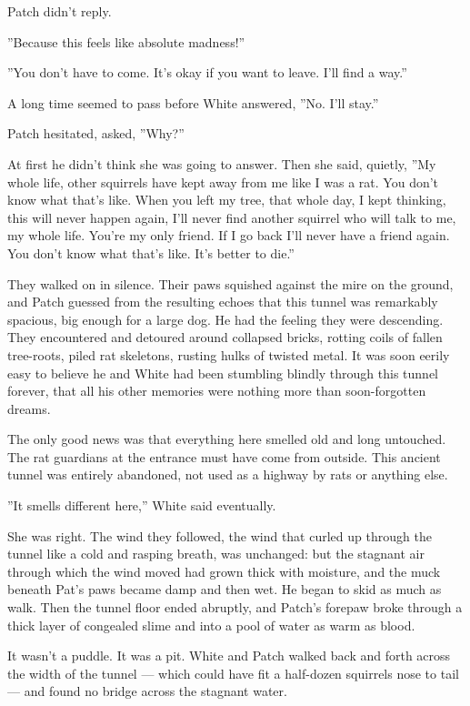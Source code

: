\documentclass[12pt]{book}
\begin{document}
Patch didn't reply.

''Because this feels like absolute madness!''

''You don't have to come. It's okay if you want to leave. I'll find a way.''

A long time seemed to pass before White answered, ''No. I'll stay.''

Patch hesitated, asked, ''Why?''

At first he didn't think she was going to answer. Then she said, quietly, ''My whole life, other squirrels have kept away from me like I was a rat. You don't know what that's like. When you left my tree, that whole day, I kept thinking, this will never happen again, I'll never find another squirrel who will talk to me, my whole life. You're my only friend. If I go back I'll never have a friend again. You don't know what that's like. It's better to die.''

They walked on in silence. Their paws squished against the mire on the ground, and Patch guessed from the resulting echoes that this tunnel was remarkably spacious, big enough for a large dog. He had the feeling they were descending. They encountered and detoured around collapsed bricks, rotting coils of fallen tree-roots, piled rat skeletons, rusting hulks of twisted metal. It was soon eerily easy to believe he and White had been stumbling blindly through this tunnel forever, that all his other memories were nothing more than soon-forgotten dreams.

The only good news was that everything here smelled old and long untouched. The rat guardians at the entrance must have come from outside. This ancient tunnel was entirely abandoned, not used as a highway by rats or anything else.

''It smells different here,'' White said eventually.

She was right. The wind they followed, the wind that curled up through the tunnel like a cold and rasping breath, was unchanged: but the stagnant air through which the wind moved had grown thick with moisture, and the muck beneath Pat's paws became damp and then wet. He began to skid as much as walk. Then the tunnel floor ended abruptly, and Patch's forepaw broke through a thick layer of congealed slime and into a pool of water as warm as blood.

It wasn't a puddle. It was a pit. White and Patch walked back and forth across the width of the tunnel ---
which could have fit a half-dozen squirrels nose to tail ---
and found no bridge across the stagnant water.
\end{document}
